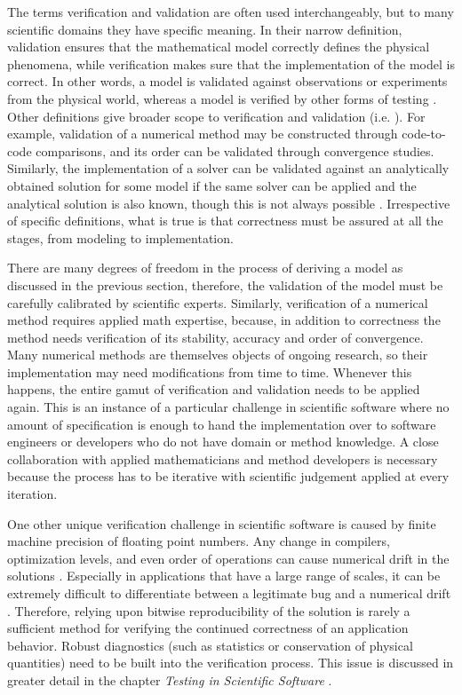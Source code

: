 The terms verification and validation are often used interchangeably,
but to many scientific domains they have specific meaning.   
In their narrow definition, validation ensures that the mathematical
model correctly defines the physical phenomena, while verification
makes sure that the implementation of the model is correct. In other
words, a model is validated against observations or experiments from
the physical world, whereas a model is verified by other forms of
testing \cite{oberkampf2002verification}.   Other definitions give
broader scope to  verification and validation (i.e. \cite{sargent1998verification}). For
example, validation of a numerical method may be constructed through
code-to-code comparisons, and its order can be validated through
convergence studies. Similarly, the implementation of a solver can be
validated against an analytically obtained solution for some model if
the same solver can be applied and the analytical solution is also
known, though this is not always possible
\cite{oberkampf2010verification}.  Irrespective of  specific
definitions, what is true is that   correctness must be assured at all
the stages, from modeling to implementation.     

There are many degrees of freedom in the process of deriving a
model as discussed in the previous section, therefore, the validation of the
model must be carefully calibrated by scientific experts. Similarly,
verification of a numerical method requires applied math expertise,
because, in addition to correctness the method needs verification of its stability, accuracy and
order of convergence. Many numerical methods 
are themselves objects of ongoing research, so their
implementation may need modifications from time to time. Whenever
this happens, the entire gamut of verification and validation needs to
be applied again. This is an instance of a particular challenge in 
scientific software where no amount of specification is enough to hand the
implementation over to software engineers or developers who do not
have domain or method knowledge. A close collaboration with applied
mathematicians and method developers is necessary because the process
has to be iterative with scientific judgement applied at every
iteration.  

One other unique verification challenge in scientific software is caused by 
finite machine precision of floating point numbers. Any change in
compilers, optimization levels, and even order of operations can cause
numerical drift in the solutions
\cite{monniaux2008pitfalls}. Especially in applications that have a
large range of scales, it can be extremely difficult to differentiate
between a legitimate bug and a numerical drift \cite{Dubey2015}. Therefore, relying
upon bitwise reproducibility of the solution is rarely a sufficient
method for verifying the continued correctness of an application
behavior. Robust diagnostics (such as statistics or conservation of
physical quantities) need to be built into the verification process.
This issue is discussed in greater detail in the chapter {\em Testing
  in Scientific Software} .  

